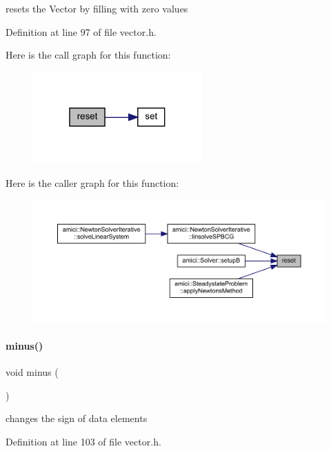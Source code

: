 resets the Vector by filling with zero values 

Definition at line 97 of file vector.\+h.

Here is the call graph for this function\+:
\nopagebreak
\begin{figure}[H]
\begin{center}
\leavevmode
\includegraphics[width=184pt]{classamici_1_1_ami_vector_ad20897c5c8bd47f5d4005989bead0e55_cgraph}
\end{center}
\end{figure}
Here is the caller graph for this function\+:
\nopagebreak
\begin{figure}[H]
\begin{center}
\leavevmode
\includegraphics[width=350pt]{classamici_1_1_ami_vector_ad20897c5c8bd47f5d4005989bead0e55_icgraph}
\end{center}
\end{figure}
\mbox{\label{classamici_1_1_ami_vector_a19ad39a609bfc430ed6f7992e841b024}} 
\paragraph{\texorpdfstring{minus()}{minus()}}
{\footnotesize\ttfamily void minus (\begin{DoxyParamCaption}{ }\end{DoxyParamCaption})}

changes the sign of data elements 

Definition at line 103 of file vector.\+h.

